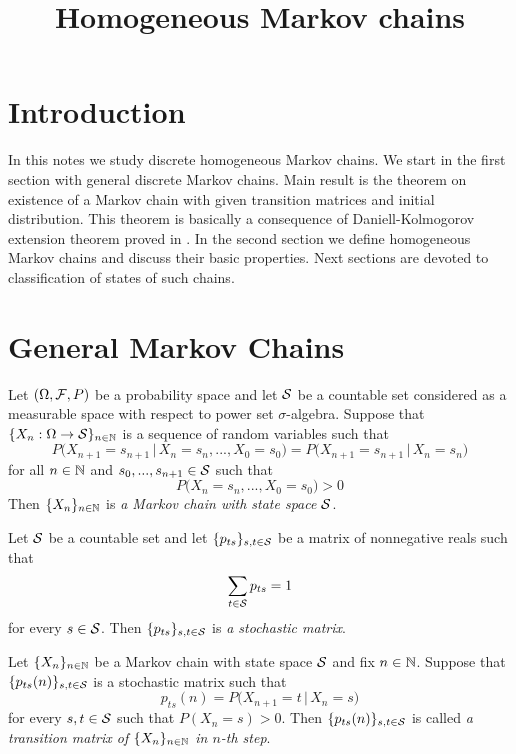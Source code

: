 


\title{Homogeneous Markov chains}
\date{}
\maketitle

\section{Introduction}
\noindent
In this notes we study discrete homogeneous Markov chains. We start in the first section with general discrete Markov chains. Main result is the theorem on existence of a Markov chain with given transition matrices and initial distribution. This theorem is basically a consequence of Daniell-Kolmogorov extension theorem proved in \cite{Daniell_Kolmogorov_extension}. In the second section we define homogeneous Markov chains and discuss their basic properties. Next sections are devoted to classification of states of such chains. 

\section{General Markov Chains}

\begin{definition}
Let $(\Omega, {\mathcal F}, P)$ be a probability space and let ${\mathcal S}$ be a countable set considered as a measurable space with respect to power set $\sigma$-algebra. Suppose that $\{X_n:\Omega\rightarrow {\mathcal S}\}_{n\in {\mathbb N}}$ is a sequence of random variables such that
$$P\big(X_{n+1} = s_{n+1}\,\big|\,X_n=s_n,...,X_0=s_0\big) = P\big(X_{n+1}=s_{n+1}\,\big|\,X_n=s_n\big)$$
for all $n\in {\mathbb N}$ and $s_0,...,s_{n+1}\in {\mathcal S}$ such that 
$$P\big(X_n=s_n,...,X_0=s_0\big) > 0$$
Then $\{X_n\}_{n\in {\mathbb N}}$ is \textit{a Markov chain with state space ${\mathcal S}$}.
\end{definition}

\begin{definition}
Let ${\mathcal S}$ be a countable set and let $\{p_{ts}\}_{s,t \in {\mathcal S}}$ be a matrix of nonnegative reals such that
$$\sum_{t\in {\mathcal S}}p_{ts} = 1$$
for every $s\in {\mathcal S}$. Then $\{p_{ts}\}_{s,t\in {\mathcal S}}$ is \textit{a stochastic matrix}.
\end{definition}

\begin{definition}
Let $\{X_n\}_{n\in {\mathbb N}}$ be a Markov chain with state space ${\mathcal S}$ and fix $n\in {\mathbb N}$. Suppose that $\{p_{ts}(n)\}_{s,t\in {\mathcal S}}$ is a stochastic matrix such that
$$p_{ts}(n) = P\big(X_{n+1}=t\,\big|\,X_n=s\big)$$
for every $s,t\in {\mathcal S}$ such that $P(X_n=s)>0$. Then $\{p_{ts}(n)\}_{s,t\in {\mathcal S}}$ is called \textit{a transition matrix of $\{X_n\}_{n\in {\mathbb N}}$ in $n$-th step}.
\end{definition}

